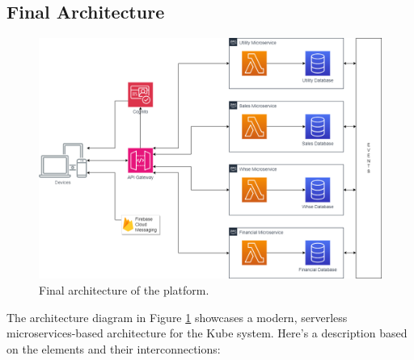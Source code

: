 \subsection{Final Architecture}
\begin{figure}
    \centering
    \includegraphics[scale=0.35]{Pictures/5_architecture2.png}
    \caption{Final architecture of the platform.}
    \label{fig:5_architecture}
\end{figure}
The architecture diagram in Figure \ref{fig:5_architecture} showcases a modern, serverless
microservices-based architecture for the Kube system. Here's a description based on the elements and
their interconnections:

